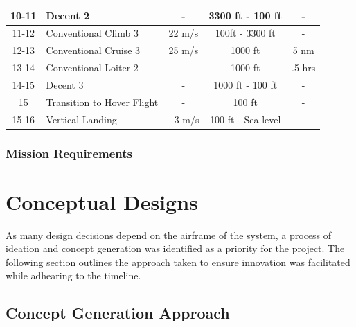 \begin{table}[H]
\begin{center}
\begin{tabular}{|c|l|c|c|c|}
10-11            & Decent 2                                  & -              & 3300 ft - 100 ft           & -             \\ \hline
11-12            & Conventional Climb 3                                 & 22 m/s         &       100ft - 3300 ft & - \\\hline
12-13            & Conventional Cruise 3                    & 25 m/s       &      1000 ft              &      5 nm                 \\ \hline
13-14            & Conventional Loiter 2                                  & -              & 1000 ft           & .5 hrs               \\ \hline
14-15            & Decent 3                                  & -              & 1000 ft - 100 ft           & -             \\ \hline
15            & Transition to Hover Flight                                   & -              & 100 ft           & -             \\ \hline
15-16            & Vertical Landing                                &  - 3 m/s              & 100 ft - Sea level          & -             \\ \hline
\end{tabular}
\end{center}
\end{table}


\subsubsection{Mission Requirements}

\clearpage
\section{Conceptual Designs}

As many design decisions depend on the airframe of the system, a process of ideation and concept generation was identified as a priority for the project. The following section outlines the approach taken to ensure innovation was facilitated while adhearing to the timeline.

\subsection{Concept Generation Approach}
\label{sec:Concept_Generation_Approach}


